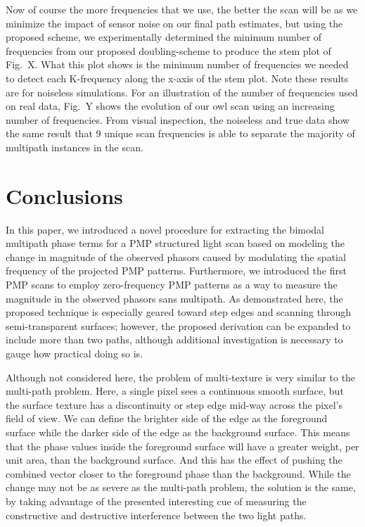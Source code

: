 \documentclass[10pt]{article}
\begin{document}
Now of course the more frequencies that we use, the better the scan will be as we minimize the impact of sensor noise on our final path estimates, but using the proposed scheme, we experimentally determined the minimum number of frequencies from our proposed doubling-scheme to produce the stem plot of Fig.~X.  What this plot shows is the minimum number of frequencies we needed to detect each K-frequency along the x-axis of the stem plot.  Note these results are for noiseless simulations.  For an illustration of the number of frequencies used on real data, Fig.~Y shows the evolution of our owl scan using an increasing number of frequencies.  From visual inspection, the noiseless and true data show the same result that 9 unique scan frequencies is able to separate the majority of multipath instances in the scan.

\section{Conclusions}
\noindent In this paper, we introduced a novel procedure for extracting the bimodal multipath phase terms for a PMP structured light scan based on modeling the change in magnitude of the observed phasors caused by modulating the spatial frequency of the projected PMP patterns. Furthermore, we introduced the first PMP scans to employ zero-frequency PMP patterns as a way to measure the magnitude in the observed phasors sans multipath. As demonstrated here, the proposed technique is especially geared toward step edges and scanning through semi-transparent surfaces; however, the proposed derivation can be expanded to include more than two paths, although additional investigation is necessary to gauge how practical doing so is. 

Although not considered here, the problem of multi-texture is very similar to the multi-path problem.  Here, a single pixel sees a continuous smooth surface, but the surface texture has a discontinuity or step edge mid-way across the pixel's field of view.  We can define the brighter side of the edge as the foreground surface while the darker side of the edge as the background surface. This means that the phase values inside the foreground surface will have a greater weight, per unit area, than the background surface.  And this has the effect of pushing the combined vector closer to the foreground phase than the background.  While the change may not be as severe as the multi-path problem, the solution is the same, by taking advantage of the presented interesting cue of measuring the constructive and destructive interference between the two light paths.
\end{document}
